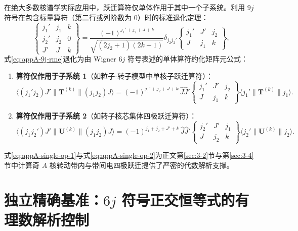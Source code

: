 在绝大多数核谱学实际应用中，跃迁算符仅单体作用于其中一个子系统。利用 $9j$ 符号在包含标量算符（第二行或列阶数为 0）时的标准退化定理：
\begin{equation}\label{eq:appA-9j-to-6j}
\begin{Bmatrix} j_1' & j_1 & k \\ j_2' & j_2 & 0 \\ J' & J & k \end{Bmatrix} = \frac{(-1)^{j_1' + j_2 + J + k}}{\sqrt{(2j_2 + 1)(2k + 1)}} \delta_{j_2 j_2'} \begin{Bmatrix} j_1' & J' & j_2 \\ J & j_1 & k \end{Bmatrix} ,
\end{equation}
式\eqref{eq:appA-9j-rme}退化为由 Wigner $6j$ 符号表述的单体算符约化矩阵元公式：
\begin{enumerate}
\item \textbf{算符仅作用于子系统 1}（如粒子-转子模型中单核子跃迁算符）：
\begin{equation}\label{eq:appA-single-op-1}
\langle (j_1' j_2) J' \| \mathbf{T}^{(k)} \| (j_1 j_2) J \rangle = (-1)^{j_1' + j_2 + J + k} \, \hat{J} \hat{J}' \begin{Bmatrix} j_1' & J' & j_2 \\ J & j_1 & k \end{Bmatrix} \langle j_1' \| \mathbf{T}^{(k)} \| j_1 \rangle .
\end{equation}
\item \textbf{算符仅作用于子系统 2}（如转子核芯集体四极跃迁算符）：
\begin{equation}\label{eq:appA-single-op-2}
\langle (j_1 j_2') J' \| \mathbf{U}^{(k)} \| (j_1 j_2) J \rangle = (-1)^{j_1 + j_2 + J' + k} \, \hat{J} \hat{J}' \begin{Bmatrix} j_2' & J' & j_1 \\ J & j_2 & k \end{Bmatrix} \langle j_2' \| \mathbf{U}^{(k)} \| j_2 \rangle .
\end{equation}
\end{enumerate}
式\eqref{eq:appA-single-op-1}与式\eqref{eq:appA-single-op-2}为正文第\ref{sec:3-2}节与第\ref{sec:3-4}节中计算奇 $A$ 核转动带内与带间电四极跃迁提供了严密的代数解析支撑。

\section{独立精确基准：$6j$ 符号正交恒等式的有理数解析控制}\label{sec:appA-4}

